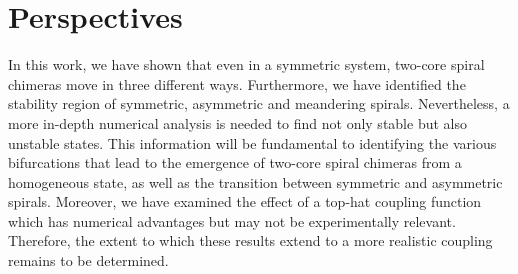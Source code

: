 





\section{Perspectives}
 

In this work, we have shown that even in a symmetric system, two-core
spiral chimeras move in three different ways. Furthermore, we have
identified the stability region of symmetric, asymmetric and meandering spirals.
Nevertheless, a more in-depth numerical analysis is needed to find not only
stable but also unstable states. This information will be fundamental to identifying
the various bifurcations that lead to the emergence of two-core spiral chimeras
from a homogeneous state, as well as the transition between symmetric and asymmetric
spirals. Moreover, we have examined the effect of a top-hat coupling function
which has numerical advantages but may not be experimentally relevant. Therefore,
the extent to which these results extend to a more realistic coupling remains
to be determined.